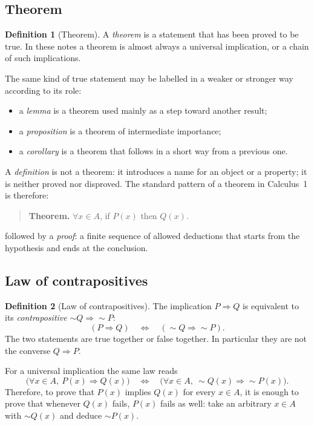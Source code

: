 \documentclass[11pt,a4paper]{article}
\theoremstyle{definition} \newtheorem{definition}{Definition} \theoremstyle{plain} \newtheorem{theorem}{Theorem}
\begin{document}
\subsection{Theorem}
\begin{definition}[Theorem] A \emph{theorem} is a statement that has been proved to be true. In these notes a theorem is almost always a universal implication, or a chain of such implications. \end{definition}
The same kind of true statement may be labelled in a weaker or stronger way according to its role: \begin{itemize}
\item a \emph{lemma} is a theorem used mainly as a step toward another result;
\item a \emph{proposition} is a theorem of intermediate importance;
\item a \emph{corollary} is a theorem that follows in a short way from a previous one. \end{itemize} A \emph{definition} is not a theorem: it introduces a name for an object or a property; it is neither proved nor disproved.
The standard pattern of a theorem in Calculus~1 is therefore: \begin{quote} \textbf{Theorem.} $\forall x\in A$, if $P(x)$ then $Q(x)$. \end{quote} followed by a \emph{proof}: a finite sequence of allowed deductions that starts from the hypothesis and ends at the conclusion.
\subsection{Law of contrapositives}
\begin{definition}[Law of contrapositives] The implication $P\Rightarrow Q$ is equivalent to its \emph{contrapositive} $\sim Q\Rightarrow \sim P$:
\[\boxed{ (P\Rightarrow Q)\quad\Leftrightarrow\quad (\sim Q\Rightarrow \sim P). }\]
The two statements are true together or false together. In particular they are not the converse $Q\Rightarrow P$. \end{definition}
For a universal implication the same law reads
\[\boxed{ \bigl(\forall x\in A,\ P(x)\Rightarrow Q(x)\bigr) \quad\Leftrightarrow\quad \bigl(\forall x\in A,\ \sim Q(x)\Rightarrow \sim P(x)\bigr). }\]
Therefore, to prove that $P(x)$ implies $Q(x)$ for every $x\in A$, it is enough to prove that whenever $Q(x)$ fails, $P(x)$ fails as well: take an arbitrary $x\in A$ with $\sim Q(x)$ and deduce $\sim P(x)$.
\end{document}
